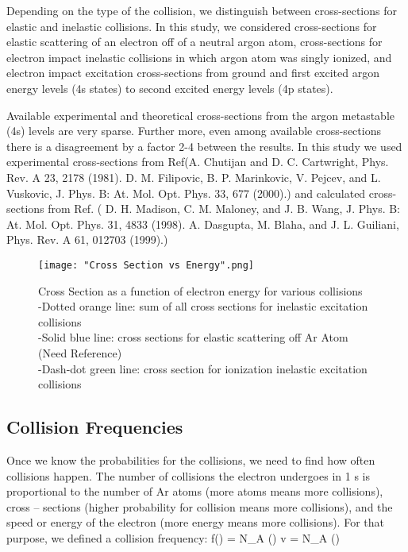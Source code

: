 \documentclass[12pt]{article}
\begin{document}
Depending on the type of the collision, we distinguish between cross-sections for elastic and inelastic collisions. In this study, we considered cross-sections for elastic scattering of an electron off of a neutral argon atom, cross-sections for electron impact inelastic collisions in which argon atom was singly ionized, and electron impact excitation cross-sections from ground and first excited argon energy levels (4s states) to second excited energy levels (4p states).

Available experimental and theoretical cross-sections from the argon metastable (4s) levels are very sparse. Further more, even among available cross-sections there is a disagreement by a factor 2-4 between the results. In this study we used experimental cross-sections from Ref(A. Chutijan and D. C. Cartwright, Phys. Rev. A 23, 2178 (1981).
D. M. Filipovic, B. P. Marinkovic, V. Pejcev, and L. Vuskovic, J. Phys. B: At. Mol. Opt. Phys. 33, 677 (2000).) and calculated cross-sections from Ref. ( D. H. Madison, C. M. Maloney, and J. B. Wang, J. Phys. B: At. Mol. Opt. Phys. 31, 4833 (1998). A. Dasgupta, M. Blaha, and J. L. Guiliani, Phys. Rev. A 61, 012703 (1999).)
{}
\begin{figure}
	\centering
	\texttt{[image: "Cross Section vs Energy".png]}
	\caption{Cross Section as a function of electron energy for various collisions\\
	-Dotted orange line: sum of all cross sections for inelastic excitation collisions\\
	-Solid blue line: cross sections for elastic scattering off Ar Atom (Need Reference) \\
	-Dash-dot green line: cross section for ionization inelastic excitation collisions
	}
	\label{Cross Sections as a Function of Energy}
	\end{figure}


\subsection{Collision Frequencies}
Once we know the probabilities for the collisions, we need to find how often collisions happen. The number of collisions the electron undergoes in 1 s is proportional to the number of Ar atoms (more atoms means more collisions), cross – sections (higher probability for collision means more collisions), and the speed or energy of the electron (more energy means more collisions).
For that purpose, we defined a collision frequency:
\beqn
f(\varepsilon) = N_{A} \sigma (\varepsilon) v = N_{A} \sigma (\varepsilon)  
\label{collision_frequency}
\eeqn
\end{document}
